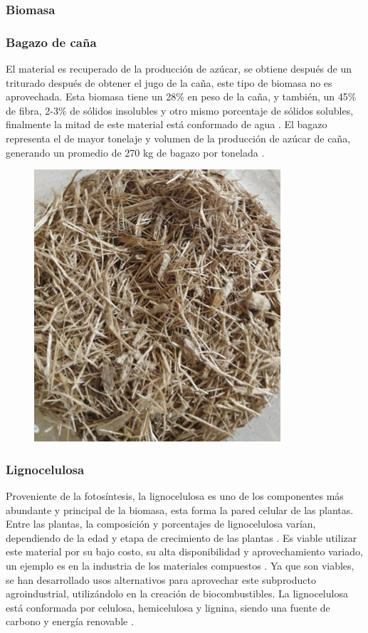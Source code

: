 \documentclass[12pt]{article}
\begin{document}
\begin{appendix}
		\subsubsection{Biomasa}
		
		\subsubsection{Bagazo de caña}
		El material es recuperado de la producción de azúcar, se obtiene después de un triturado después de obtener el jugo de la caña, este tipo de biomasa no es aprovechada. Esta biomasa tiene un 28\% en peso de la caña, y también, un 45\% de fibra, 2-3\% de sólidos insolubles y otro mismo porcentaje de sólidos solubles, finalmente la mitad de este material está conformado de agua \cite{olmo2015bagazo}.
		El bagazo representa el de mayor tonelaje y volumen de la producción de azúcar de caña, generando un promedio de 270 kg de bagazo por tonelada \cite{perez2022efecto}.
		
		\begin{figure}[h]
			\centering
			\includegraphics[width=0.4\linewidth]{imagenes/bagazo}
			\caption[Bagazo de caña]{}
			\label{fig:bagazo}
		\end{figure}
		
		\subsubsection{Lignocelulosa}
		
		Proveniente de la fotosíntesis, la lignocelulosa es uno de los componentes más abundante y principal de la biomasa, esta forma la pared celular de las plantas. Entre las plantas, la composición y porcentajes de lignocelulosa varían, dependiendo de la edad y etapa de crecimiento de las plantas \cite{cuervo2009lignocelulosa}.
		Es viable utilizar este material por su bajo costo, su alta disponibilidad y aprovechamiento variado, un ejemplo es en la industria de los materiales compuestos \cite{jara2022principales}.
		Ya que son viables, se han desarrollado usos alternativos para aprovechar este subproducto agroindustrial, utilizándolo en la creación de biocombustibles.
		La lignocelulosa está conformada por celulosa, hemicelulosa y lignina, siendo una fuente de carbono y energía renovable \cite{portalproduccion}. 
		

\end{appendix}
\end{document}
